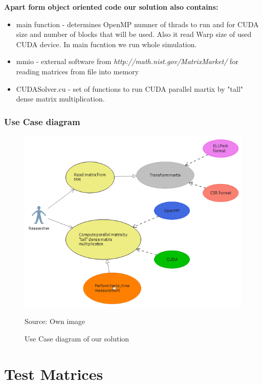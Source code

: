 \documentclass{scrreprt}
\begin{document}
\textbf{Apart form object oriented code our solution also contains:}

\begin{itemize}
\item main function - determines OpenMP numner of thrads to run and for CUDA size and number of blocks that will be used. Also it read Warp size of used CUDA device. In main fucntion we run whole simulation.

\item mmio - external software from \textit{http://math.nist.gov/MatrixMarket/} for reading matrices from file into memory

\item CUDASolver.cu - set of functions to run CUDA parallel martix by "tall" dense matrix multiplication.

\end{itemize}


\subsection{Use Case diagram}

\begin{figure}[h!]
\label{UseCaseDiagram}
\centering
\includegraphics{UseCaseDiagramResearcher.PNG}
\caption{Use Case diagram of our solution}
Source: Own image
\end{figure}
\FloatBarrier

\chapter{Test Matrices}
\end{document}
